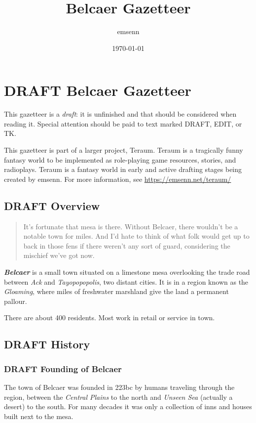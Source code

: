 \documentclass[11pt]{teraum_reference_book}
\author{emsenn}
\date{\today}
\title{Belcaer Gazetteer}
\begin{document}
\section*{{\bfseries\sffamily DRAFT} Belcaer Gazetteer}
\label{sec:org8b84f33}
This gazetteer is a \emph{draft}: it is unfinished and that should be considered when reading it. Special attention should be paid to text marked DRAFT, EDIT, or TK.

This gazetteer is part of a larger project, Teraum. Teraum is a tragically funny fantasy world to be implemented as role-playing game resources, stories, and radioplays. Teraum is a fantasy world in early and active drafting stages being created by emsenn. For more information, see \href{https://emsenn.net/teraum/}{https://emsenn.net/teraum/}
\subsection*{{\bfseries\sffamily DRAFT} Overview}
\label{sec:orgbaaa67e}
\begin{quote}
It's fortunate that mesa is there. Without Belcaer, there wouldn't be
a notable town for miles. And I'd hate to think of what folk would get
up to back in those fens if there weren't any sort of guard,
considering the mischief we've got now.
\end{quote}

\textbf{\emph{Belcaer}} is a small town situated on a limestone mesa overlooking
the trade road between \emph{Ack} and \emph{Tayopopopolis}, two distant cities.
It is in a region known as the \emph{Gloaming}, where miles of freshwater
marshland give the land a permanent pallour.

There are about 400 residents. Most work in retail or service in town.
\subsection*{{\bfseries\sffamily DRAFT} History}
\label{sec:orgae79204}
\subsubsection*{{\bfseries\sffamily DRAFT} Founding of Belcaer}
\label{sec:org20f21ce}
The town of Belcaer was founded in 223bc by humans traveling through
the region, between the \emph{Central Plains} to the north and \emph{Unseen Sea}
(actually a desert) to the south. For many decades it was only a
collection of inns and houses built next to the mesa.
\end{document}
